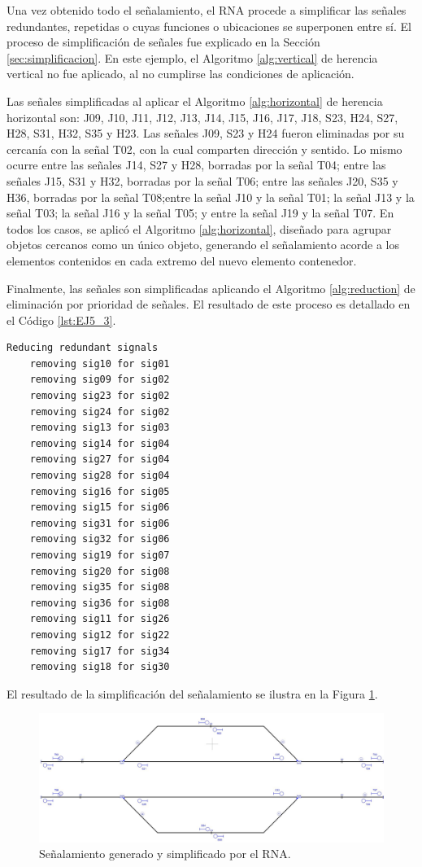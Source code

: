 	Una vez obtenido todo el señalamiento, el RNA procede a simplificar las señales redundantes, repetidas o cuyas funciones o ubicaciones se superponen entre sí. El proceso de simplificación de señales fue explicado en la Sección \ref{sec:simplificacion}. En este ejemplo, el Algoritmo \ref{alg:vertical} de herencia vertical no fue aplicado, al no cumplirse las condiciones de aplicación.
	
	Las señales simplificadas al aplicar el Algoritmo \ref{alg:horizontal} de herencia horizontal son: J09, J10, J11, J12, J13, J14, J15, J16, J17, J18, S23, H24, S27, H28, S31, H32, S35 y H23. Las señales J09, S23 y H24 fueron eliminadas por su cercanía con la señal T02, con la cual comparten dirección y sentido. Lo mismo ocurre entre las señales J14, S27 y H28, borradas por la señal T04; entre las señales J15, S31 y H32, borradas por la señal T06; entre las señales J20, S35 y H36, borradas por la señal T08;entre la señal J10 y la señal T01; la señal J13 y la señal T03; la señal J16 y la señal T05; y entre la señal J19 y la señal T07. En todos los casos, se aplicó el Algoritmo \ref{alg:horizontal}, diseñado para agrupar objetos cercanos como un único objeto, generando el señalamiento acorde a los elementos contenidos en cada extremo del nuevo elemento contenedor.
	
	Finalmente, las señales son simplificadas aplicando el Algoritmo \ref{alg:reduction} de eliminación por prioridad de señales. El resultado de este proceso es detallado en el Código \ref{lst:EJ5_3}.
	
	\begin{lstlisting}[language = {}, caption = Reducción de señalamiento por prioridad de señales, label = {lst:EJ5_3}]
	Reducing redundant signals
	removing sig10 for sig01
	removing sig09 for sig02
	removing sig23 for sig02
	removing sig24 for sig02
	removing sig13 for sig03
	removing sig14 for sig04
	removing sig27 for sig04
	removing sig28 for sig04
	removing sig16 for sig05
	removing sig15 for sig06
	removing sig31 for sig06
	removing sig32 for sig06
	removing sig19 for sig07
	removing sig20 for sig08
	removing sig35 for sig08
	removing sig36 for sig08
	removing sig11 for sig26
	removing sig12 for sig22
	removing sig17 for sig34
	removing sig18 for sig30
	\end{lstlisting}
	
	El resultado de la simplificación del señalamiento se ilustra en la Figura \ref{fig:EJ5_7}.
	
	\begin{figure}[H]
		\centering
		\includegraphics[width=1\textwidth]{resultados-obtenidos/ejemplo5/images/5_RNA.png}
		\centering\caption{Señalamiento generado y simplificado por el RNA.}
		\label{fig:EJ5_7}
	\end{figure}
	
